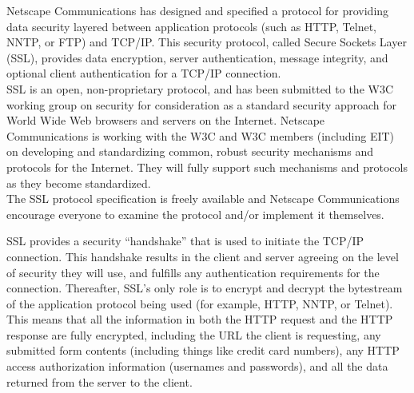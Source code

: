 \begin{htmllist}
    
    
    Netscape Communications has designed and specified a protocol for
    providing data security layered between application protocols (such as
    HTTP, Telnet, NNTP, or FTP) and TCP/IP. This security protocol, called
    Secure Sockets Layer (SSL), provides data encryption, server
    authentication, message integrity, and optional client authentication
    for a TCP/IP connection.\\
    
    SSL is an open, non-proprietary protocol, and has been submitted to the
    W3C working group on security for consideration as a standard security
    approach for World Wide Web browsers and servers on the Internet.
    Netscape Communications is working with the W3C and W3C members
    (including EIT) on developing and standardizing common, robust security
    mechanisms and protocols for the Internet. They will fully support such
    mechanisms and protocols as they become standardized.\\
    
    The SSL protocol specification is freely available and Netscape
    Communications encourage everyone to examine the protocol and/or
    implement it themselves.\\

    
    SSL provides a security ``handshake'' that is used to initiate the
    TCP/IP connection. This handshake results in the client and server
    agreeing on the level of security they will use, and fulfills any
    authentication requirements for the connection. Thereafter, SSL's only
    role is to encrypt and decrypt the bytestream of the application
    protocol being used (for example, HTTP, NNTP, or Telnet). This means
    that all the information in both the HTTP request and the HTTP response
    are fully encrypted, including the URL the client is requesting, any
    submitted form contents (including things like credit card numbers),
    any HTTP access authorization information (usernames and passwords),
    and all the data returned from the server to the client.\\
    

\end{htmllist}
